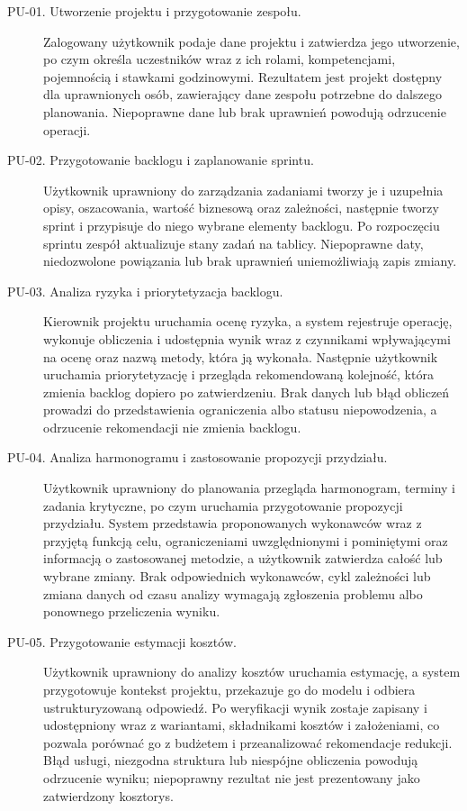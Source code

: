 \begin{description}
    \item[PU-01. Utworzenie projektu i przygotowanie zespołu.]
    \label{subsec:pu-utworzenie-projektu}
    Zalogowany użytkownik podaje dane projektu i zatwierdza jego utworzenie, po czym określa uczestników wraz z ich rolami, kompetencjami, pojemnością i stawkami godzinowymi. Rezultatem jest projekt dostępny dla uprawnionych osób, zawierający dane zespołu potrzebne do dalszego planowania. Niepoprawne dane lub brak uprawnień powodują odrzucenie operacji.

    \item[PU-02. Przygotowanie backlogu i zaplanowanie sprintu.]
    \label{subsec:pu-planowanie-sprintu}
    Użytkownik uprawniony do zarządzania zadaniami tworzy je i uzupełnia opisy, oszacowania, wartość biznesową oraz zależności, następnie tworzy sprint i przypisuje do niego wybrane elementy backlogu. Po rozpoczęciu sprintu zespół aktualizuje stany zadań na tablicy. Niepoprawne daty, niedozwolone powiązania lub brak uprawnień uniemożliwiają zapis zmiany.

    \item[PU-03. Analiza ryzyka i priorytetyzacja backlogu.]
    \label{subsec:pu-ryzyko-priorytety}
    Kierownik projektu uruchamia ocenę ryzyka, a system rejestruje operację, wykonuje obliczenia i udostępnia wynik wraz z czynnikami wpływającymi na ocenę oraz nazwą metody, która ją wykonała. Następnie użytkownik uruchamia priorytetyzację i przegląda rekomendowaną kolejność, która zmienia backlog dopiero po zatwierdzeniu. Brak danych lub błąd obliczeń prowadzi do przedstawienia ograniczenia albo statusu niepowodzenia, a odrzucenie rekomendacji nie zmienia backlogu.

    \item[PU-04. Analiza harmonogramu i zastosowanie propozycji przydziału.]
    \label{subsec:pu-harmonogram}
    Użytkownik uprawniony do planowania przegląda harmonogram, terminy i zadania krytyczne, po czym uruchamia przygotowanie propozycji przydziału. System przedstawia proponowanych wykonawców wraz z przyjętą funkcją celu, ograniczeniami uwzględnionymi i pominiętymi oraz informacją o zastosowanej metodzie, a użytkownik zatwierdza całość lub wybrane zmiany. Brak odpowiednich wykonawców, cykl zależności lub zmiana danych od czasu analizy wymagają zgłoszenia problemu albo ponownego przeliczenia wyniku.

    \item[PU-05. Przygotowanie estymacji kosztów.]
    \label{subsec:pu-estymacja-kosztow}
    Użytkownik uprawniony do analizy kosztów uruchamia estymację, a system przygotowuje kontekst projektu, przekazuje go do modelu i odbiera ustrukturyzowaną odpowiedź. Po weryfikacji wynik zostaje zapisany i udostępniony wraz z wariantami, składnikami kosztów i założeniami, co pozwala porównać go z budżetem i przeanalizować rekomendacje redukcji. Błąd usługi, niezgodna struktura lub niespójne obliczenia powodują odrzucenie wyniku; niepoprawny rezultat nie jest prezentowany jako zatwierdzony kosztorys.
\end{description}


